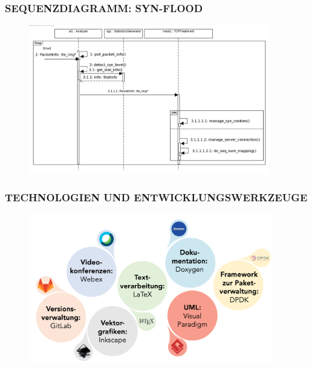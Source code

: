 \documentclass{beamer}
\begin{document}

\begin{frame}
    \frametitle{SEQUENZDIAGRAMM: SYN-FLOOD}
    \vspace{0.5cm}
    \begin{figure}[ht]
        \centering
        \includegraphics[height=6.5cm]{img/sequenzdiagramm_syn_flut.png}
    \end{figure}
\end{frame}

\begin{frame}
    \frametitle{TECHNOLOGIEN UND ENTWICKLUNGSWERKZEUGE}
    \begin{figure}[ht]
        \centering
        \includegraphics[height=6.5cm]{img/werkzeuge.png}
    \end{figure}
\end{frame}

\end{document}
